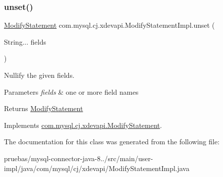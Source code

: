 \subsubsection{\texorpdfstring{unset()}{unset()}}
{\footnotesize\ttfamily \mbox{\hyperlink{interfacecom_1_1mysql_1_1cj_1_1xdevapi_1_1_modify_statement}{Modify\+Statement}} com.\+mysql.\+cj.\+xdevapi.\+Modify\+Statement\+Impl.\+unset (\begin{DoxyParamCaption}\item[{String...}]{fields }\end{DoxyParamCaption})}

Nullify the given fields.


\begin{DoxyParams}{Parameters}
{\em fields} & one or more field names \\
\hline
\end{DoxyParams}
\begin{DoxyReturn}{Returns}
\mbox{\hyperlink{interfacecom_1_1mysql_1_1cj_1_1xdevapi_1_1_modify_statement}{Modify\+Statement}} 
\end{DoxyReturn}


Implements \mbox{\hyperlink{interfacecom_1_1mysql_1_1cj_1_1xdevapi_1_1_modify_statement_a32c8da3dfdab70bf211d44db0c2f7ca2}{com.\+mysql.\+cj.\+xdevapi.\+Modify\+Statement}}.



The documentation for this class was generated from the following file\+:\begin{DoxyCompactItemize}
\item 
pruebas/mysql-\/connector-\/java-\/8../src/main/user-\/impl/java/com/mysql/cj/xdevapi/Modify\+Statement\+Impl.\+java\end{DoxyCompactItemize}
